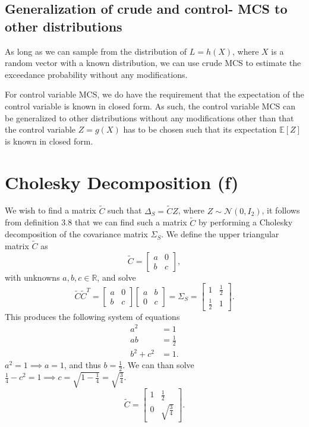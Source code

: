 \documentclass{article}
\begin{document}
\subsection{Generalization of crude and control- MCS to other distributions}
As long as we can sample from the distribution of $L = h(X)$, where $X$ is a random vector with a known distribution, we can use crude MCS to estimate the exceedance probability without any modifications. \vspace{0.5cm}

For control variable MCS, we do have the requirement that the expectation of the control variable is known in closed form. As such, the control variable MCS can be generalized to other distributions without any modifications other than that the control variable $Z = g(X)$ has to be chosen such that its expectation $\mathbb{E}[Z]$ is known in closed form.

\section{Cholesky Decomposition (f)}
We wish to find a matrix $\tilde{C}$ such that $\Delta_S = \tilde{C}Z$, where $Z \sim \mathcal{N}(0, I_2)$, it follows from definition 3.8 that we can find such a matrix $\tilde{C}$ by performing a Cholesky decomposition of the covariance matrix $\Sigma_S$. We define the upper triangular matrix     $\tilde{C}$ as
\begin{equation*}
    \tilde{C} = \begin{bmatrix}
        a & 0\\
        b & c
    \end{bmatrix},
\end{equation*}
with unknowns $a, b, c \in \mathbb{R}$, and solve
\begin{equation*}
    \tilde{C}\tilde{C}^T = \begin{bmatrix}
        a & 0\\
        b & c
    \end{bmatrix} \begin{bmatrix}
        a & b\\
        0 & c
    \end{bmatrix}  = \Sigma_S = \begin{bmatrix}
        1 & \frac{1}{2}\\
        \frac{1}{2} & 1
    \end{bmatrix}.
\end{equation*}
This produces the following system of equations
\begin{align*}
    a^2  &= 1\\
    ab &= \frac{1}{2}\\
    b^2 + c^2 &= 1.
\end{align*}
$a^2 = 1 \implies a = 1$, and thus $b = \frac{1}{2}$. We can than solve $\frac{1}{4} - c^2 = 1 \implies c = \sqrt{1 - \frac{1}{4}} = \sqrt{\frac{3}{4}}$.
\begin{equation*}
    \tilde{C} = \begin{bmatrix}
        1 & \frac{1}{2}\\
        0 & \sqrt{\frac{3}{4}}
    \end{bmatrix}.
\end{equation*}
\end{document}
